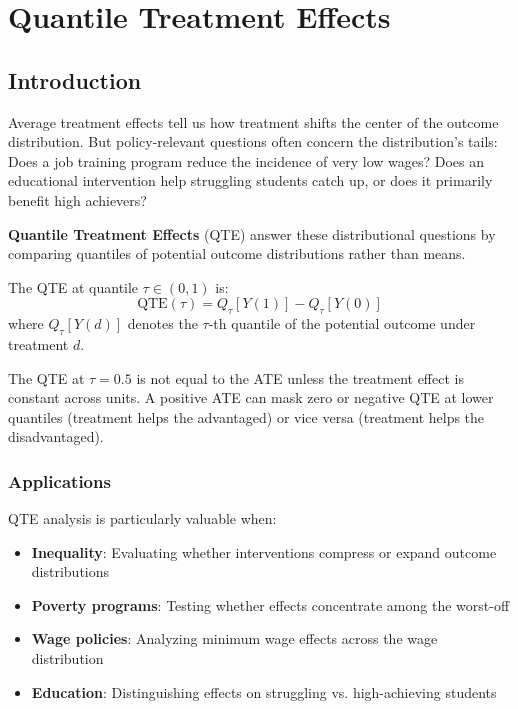 \chapter{Quantile Treatment Effects}
\label{ch:qte}

\section{Introduction}

Average treatment effects tell us how treatment shifts the center of the outcome distribution. But policy-relevant questions often concern the distribution's tails: Does a job training program reduce the incidence of very low wages? Does an educational intervention help struggling students catch up, or does it primarily benefit high achievers?

\textbf{Quantile Treatment Effects} (QTE) answer these distributional questions by comparing quantiles of potential outcome distributions rather than means.

\begin{definition}
The QTE at quantile $\tau \in (0,1)$ is:
\[
\text{QTE}(\tau) = Q_\tau[Y(1)] - Q_\tau[Y(0)]
\]
where $Q_\tau[Y(d)]$ denotes the $\tau$-th quantile of the potential outcome under treatment $d$.
\end{definition}

\begin{insight}
The QTE at $\tau = 0.5$ is not equal to the ATE unless the treatment effect is constant across units. A positive ATE can mask zero or negative QTE at lower quantiles (treatment helps the advantaged) or vice versa (treatment helps the disadvantaged).
\end{insight}

\subsection{Applications}

QTE analysis is particularly valuable when:
\begin{itemize}
    \item \textbf{Inequality}: Evaluating whether interventions compress or expand outcome distributions
    \item \textbf{Poverty programs}: Testing whether effects concentrate among the worst-off
    \item \textbf{Wage policies}: Analyzing minimum wage effects across the wage distribution
    \item \textbf{Education}: Distinguishing effects on struggling vs. high-achieving students
\end{itemize}

